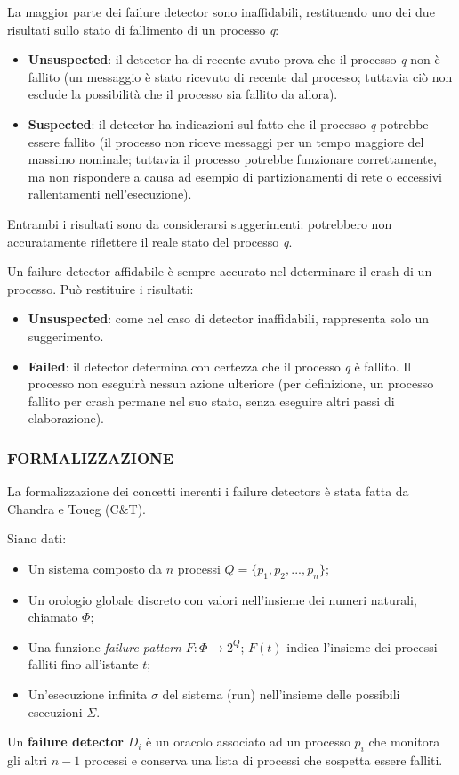 La maggior parte dei failure detector sono inaffidabili, restituendo uno dei due risultati sullo stato di fallimento di un processo \textit{q}:
\begin{itemize}
    \item \textbf{Unsuspected}: il detector ha di recente avuto prova che il processo \textit{q} non è fallito (un messaggio è stato ricevuto di recente dal processo; tuttavia ciò non esclude la possibilità che il processo sia fallito da allora).
    \item \textbf{Suspected}: il detector ha indicazioni sul fatto che il processo \textit{q} potrebbe essere fallito (il processo non riceve messaggi per un tempo maggiore del massimo nominale; tuttavia il processo potrebbe funzionare correttamente, ma non rispondere a causa ad esempio di partizionamenti di rete o eccessivi rallentamenti nell'esecuzione).
\end{itemize}
Entrambi i risultati sono da considerarsi suggerimenti: potrebbero non accuratamente riflettere il reale stato del processo \textit{q}.

\vspace{5mm}

Un failure detector affidabile è sempre accurato nel determinare il crash di un processo. Può restituire i risultati:
\begin{itemize}
    \item \textbf{Unsuspected}: come nel caso di detector inaffidabili, rappresenta solo un suggerimento.
    \item \textbf{Failed}: il detector determina con certezza che il processo \textit{q} è fallito. Il processo non eseguirà nessun azione ulteriore (per definizione, un processo fallito per crash permane nel suo stato, senza eseguire altri passi di elaborazione).
\end{itemize}
\subsubsection{FORMALIZZAZIONE}
La formalizzazione dei concetti inerenti i failure detectors è stata fatta da Chandra e Toueg (C\&T).

Siano dati:
\begin{itemize}
    \item Un sistema composto da $n$ processi $Q=\{p_{1}, p_{2}, ..., p_{n}\}$;
    \item Un orologio globale discreto con valori nell'insieme dei numeri naturali, chiamato $\Phi$;
    \item Una funzione \textit{failure pattern} $F: \Phi \rightarrow 2^{Q}$; $F(t)$ indica l'insieme dei processi falliti fino all'istante $t$;
    \item Un'esecuzione infinita $\sigma$ del sistema (run) nell'insieme delle possibili esecuzioni $\Sigma$.
\end{itemize}
Un \textbf{failure detector} $D_{i}$ è un oracolo associato ad un processo $p_{i}$ che monitora gli altri $n-1$ processi e conserva una lista di processi che sospetta essere falliti.

